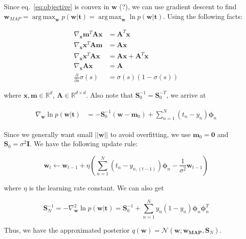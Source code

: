 \documentclass{article}
\newcommand{\phib}{\bm{\phi}}
\DeclareMathOperator*{\argmax}{arg\,max}
\begin{document}
Since eq.~\ref{eq:objective} is convex in $\bm{w}$ (?), we can use gradient
descent to find $\bm{w}_{MAP} = \argmax_{\bm{w}} p(\bm{w}|\bm{t})
=\argmax_{\bm{w}} \ln p(\bm{w}|\bm{t})$. Using the following facts:

\begin{align}
\nabla_{\bm{x}} \bm{m}^T \bm{A}\bm{x} &= \bm{A}^T\bm{x}
\\
\nabla_{\bm{x}} \bm{x}^T \bm{A}\bm{m} &= \bm{A}\bm{x}
\\
\nabla_{\bm{x}} \bm{x}^T \bm{A}\bm{x} &= \bm{A}\bm{x}+\bm{A}^T\bm{x}
\\
\nabla_{\bm{x}} \bm{A}\bm{x} &= \bm{A}
\\
\frac{\partial}{\partial s} \sigma(s) &= \sigma(s)(1-\sigma(s))
\end{align}

where $\bm{x},\bm{m} \in \mathbb{R}^d$, $\bm{A}\in \mathbb{R}^{d\times d}$.
Also note that $\bm{S}_0^{-1} = \bm{S}_0^{-T}$, we
arrive at

\begin{align}
\begin{split}
\label{eq:gradient}
\nabla_{\bm{w}} \ln p(\bm{w}|\bm{t}) &= -\bm{S}_0^{-1} (\bm{w}-\bm{m}_0) +
\sum_{n=1}^N (t_n - y_n) \phib_n
\end{split}
\end{align}

Since we generally want small $||\bm{w}||$ to avoid overfitting, we use
$\bm{m}_0 = \bm{0}$ and $\bm{S}_0 = \sigma^2 \bm{I}$. We have the following
update rule:

\begin{equation}
\bm{w}_t \leftarrow \bm{w}_{t-1} + \eta\left( \sum_{n=1}^N (t_n - y_{n,(t-1)}) \phib_n -
\frac{1}{\sigma^2}\bm{w}_{t-1} \right)
\end{equation}

where $\eta$ is the learning rate constant. We can also get

\begin{equation}
\bm{S}_N^{-1} = -\nabla^2_{\bm{w}} \ln p(\bm{w}|\bm{t})
= \bm{S}_0^{-1} + \sum_{n=1}^N y_n(1-y_n) \phib_n \phib_n^T
\end{equation}

Thus, we have the approximated posterior $q(\bm{w}) =
\mathcal{N}(\bm{w};\bm{w_{MAP}},\bm{S}_N)$.


\end{document}
